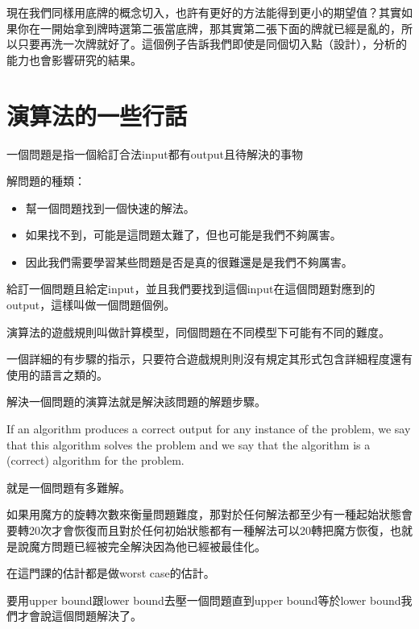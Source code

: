 現在我們同樣用底牌的概念切入，也許有更好的方法能得到更小的期望值？其實如果你在一開始拿到牌時選第二張當底牌，那其實第二張下面的牌就已經是亂的，所以只要再洗一次牌就好了。這個例子告訴我們即使是同個切入點（設計），分析的能力也會影響研究的結果。

\section{演算法的一些行話}
\begin{definition}[問題Problem]
一個問題是指一個給訂合法input都有output且待解決的事物
\end{definition}
解問題的種類：
\begin{itemize}
  \item 幫一個問題找到一個快速的解法。
  \item 如果找不到，可能是這問題太難了，但也可能是我們不夠厲害。
  \item 因此我們需要學習某些問題是否是真的很難還是是我們不夠厲害。
\end{itemize}
\begin{definition}
  給訂一個問題且給定input，並且我們要找到這個input在這個問題對應到的output，這樣叫做一個問題個例。
\end{definition}
\begin{definition}
演算法的遊戲規則叫做計算模型，同個問題在不同模型下可能有不同的難度。
\end{definition}

\begin{definition}[演算法Algorithm]
一個詳細的有步驟的指示，只要符合遊戲規則則沒有規定其形式包含詳細程度還有使用的語言之類的。
\end{definition}
解決一個問題的演算法就是解決該問題的解題步驟。
\begin{note}
  If an algorithm produces a correct output for any instance of the problem, we say that this algorithm solves the problem and we say that the algorithm is a (correct) algorithm for the problem.
\end{note}

\begin{definition}[困難程度]
  就是一個問題有多難解。
\end{definition}

\begin{eg}
  如果用魔方的旋轉次數來衡量問題難度，那對於任何解法都至少有一種起始狀態會要轉20次才會恢復而且對於任何初始狀態都有一種解法可以20轉把魔方恢復，也就是說魔方問題已經被完全解決因為他已經被最佳化。
\end{eg}

\begin{note}
  在這門課的估計都是做worst case的估計。
\end{note}

\begin{note}
  要用upper bound跟lower bound去壓一個問題直到upper bound等於lower bound我們才會說這個問題解決了。
\end{note}